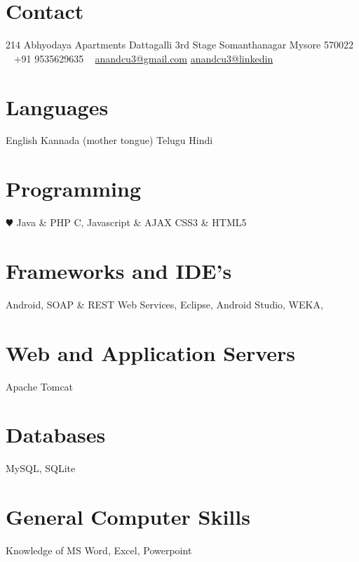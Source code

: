 \documentclass[]{friggeri-cv} %
\begin{document}


\begin{aside} %
\section{Contact}
214 Abhyodaya Apartments
Dattagalli 3rd Stage
Somanthanagar
Mysore 570022
~
+91 9535629635
~
\href{mailto:anandcu3@gmail.com}{anandcu3@gmail.com}
\href{https://www.linkedin.com/in/anandcu3}{anandcu3@linkedin}
\section{Languages}
English 
Kannada (mother tongue)
Telugu
Hindi
\section{Programming}
{\color{black} $\varheartsuit$} Java \& PHP
C, Javascript \& AJAX 
CSS3 \& HTML5
\section{Frameworks and IDE's}
Android, SOAP \& REST Web Services, Eclipse, Android Studio, WEKA, 
\section{Web and Application Servers}
Apache Tomcat
\section{Databases}
MySQL, SQLite 
\section{General Computer Skills}
Knowledge of MS Word, Excel, Powerpoint 
\end{aside}

\end{document}
